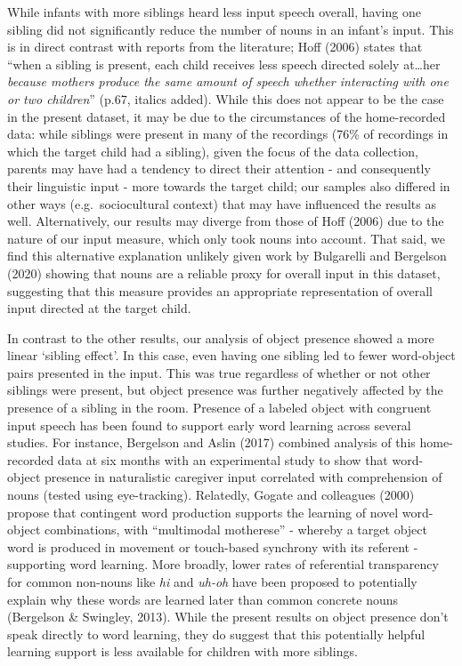 \documentclass[
  man,mask,floatsintext]{apa6}
\begin{document}
While infants with more siblings heard less input speech overall, having one sibling did not significantly reduce the number of nouns in an infant's input. This is in direct contrast with reports from the literature; Hoff (2006) states that ``when a sibling is present, each child receives less speech directed solely at\ldots her \emph{because mothers produce the same amount of speech whether interacting with one or two children}'' (p.67, italics added). While this does not appear to be the case in the present dataset, it may be due to the circumstances of the home-recorded data: while siblings were present in many of the recordings (76\% of recordings in which the target child had a sibling), given the focus of the data collection, parents may have had a tendency to direct their attention - and consequently their linguistic input - more towards the target child; our samples also differed in other ways (e.g.~sociocultural context) that may have influenced the results as well. Alternatively, our results may diverge from those of Hoff (2006) due to the nature of our input measure, which only took nouns into account. That said, we find this alternative explanation unlikely given work by Bulgarelli and Bergelson (2020) showing that nouns are a reliable proxy for overall input in this dataset, suggesting that this measure provides an appropriate representation of overall input directed at the target child.

In contrast to the other results, our analysis of object presence showed a more linear `sibling effect'. In this case, even having one sibling led to fewer word-object pairs presented in the input. This was true regardless of whether or not other siblings were present, but object presence was further negatively affected by the presence of a sibling in the room. Presence of a labeled object with congruent input speech has been found to support early word learning across several studies. For instance, Bergelson and Aslin (2017) combined analysis of this home-recorded data at six months with an experimental study to show that word-object presence in naturalistic caregiver input correlated with comprehension of nouns (tested using eye-tracking). Relatedly, Gogate and colleagues (2000) propose that contingent word production supports the learning of novel word-object combinations, with ``multimodal motherese'' - whereby a target object word is produced in movement or touch-based synchrony with its referent - supporting word learning. More broadly, lower rates of referential transparency for common non-nouns like \emph{hi} and \emph{uh-oh} have been proposed to potentially explain why these words are learned later than common concrete nouns (Bergelson \& Swingley, 2013). While the present results on object presence don't speak directly to word learning, they do suggest that this potentially helpful learning support is less available for children with more siblings.
\end{document}
